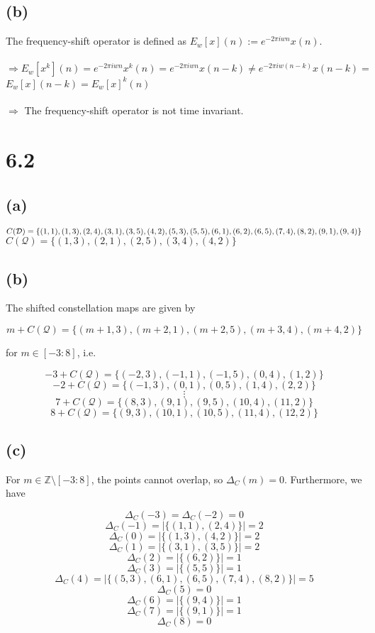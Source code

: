 \documentclass[12pt]{article}
\begin{document}
\subsection*{(b)}
The frequency-shift operator is defined as $E_{w}[x](n):=e^{-2\pi iwn}x(n)$.\\\\
$\Rightarrow E_{w}[x^{k}](n)=e^{-2\pi iwn}x^{k}(n) = e^{-2\pi iwn}x(n-k) \neq e^{-2\pi iw(n-k)}x(n-k) =$\\ $E_{w}[x](n-k) = E_{w}[x]^{k}(n)$\\\\
$\Rightarrow$ The frequency-shift operator is not time invariant.

\section*{6.2}
\subsection*{(a)}

$C(\mathcal{D}) = \{(1,1), (1,3), (2,4), (3,1), (3,5), (4,2), (5,3),\\
(5,5), (6,1), (6,2), (6,5), (7,4), (8,2), (9,1), (9,4)\}$\\
$C(\mathcal{Q})=\{(1,3), (2,1), (2,5), (3,4), (4,2)\}$

\subsection*{(b)}
The shifted constellation maps are given by

$$m + C(\mathcal{Q}) = \{(m+1,3), (m+2,1),(m+2,5),(m+3,4),(m+4,2)\}$$

for $m \in [-3:8]$, i.e.

$$-3+ C(\mathcal{Q}) = \{(-2,3), (-1,1), (-1,5), (0,4), (1,2)\}$$
$$-2+ C(\mathcal{Q}) = \{(-1,3), (0,1), (0,5), (1,4), (2,2)\}$$
$$\vdots$$
$$7+ C(\mathcal{Q}) = \{(8,3), (9,1), (9,5), (10,4), (11,2)\}$$
$$8+ C(\mathcal{Q}) = \{(9,3), (10,1), (10,5), (11,4), (12,2)\}$$

\subsection*{(c)}
For $m \in \mathbb{Z} \setminus [-3:8]$, the points cannot overlap, so $\Delta_C(m) = 0$. Furthermore, we have

$$\Delta_C(-3) = \Delta_C(-2) = 0$$
$$\Delta_C(-1) = |\{(1,1), (2,4)\}| = 2$$
$$\Delta_C(0) = |\{(1,3), (4,2)\}| = 2$$
$$\Delta_C(1) = |\{(3,1), (3,5)\}| = 2$$
$$\Delta_C(2) = |\{(6,2)\}| = 1$$
$$\Delta_C(3) = |\{(5,5)\}| = 1$$
$$\Delta_C(4) = |\{(5,3), (6,1), (6,5), (7,4), (8,2)\}| = 5$$
$$\Delta_C(5) = 0$$
$$\Delta_C(6) = |\{(9,4)\}| = 1$$
$$\Delta_C(7) = |\{(9,1)\}| = 1$$
$$\Delta_C(8) = 0 $$
\end{document}
